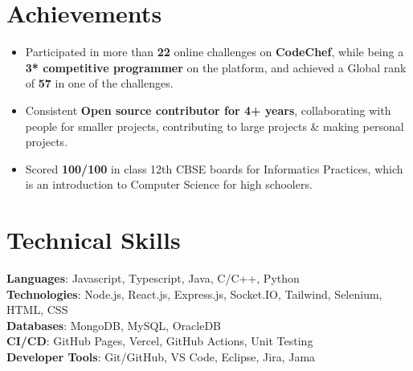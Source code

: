 \documentclass[letterpaper,11pt]{article}
\newcommand{\resumeItem}[1]{
  \item\small{
    {#1 \vspace{-2pt}}
  }
}
\newcommand{\resumeItemListStart}{\begin{itemize}}
\newcommand{\resumeItemListEnd}{\end{itemize}\vspace{-5pt}}
\begin{document}
\section{Achievements}
  \resumeItemListStart
    \resumeItem{Participated in more than \textbf{22} online challenges on \textbf{CodeChef}, while being a \textbf{3* competitive programmer} on the platform, and achieved a Global rank of \textbf{57} in one of the challenges.}
    \resumeItem{Consistent \textbf{Open source contributor for 4+ years}, collaborating with people for smaller projects, contributing to large projects \& making personal projects.}
    \resumeItem{Scored \textbf{100/100} in class 12th CBSE boards for Informatics Practices, which is an introduction to Computer Science for high schoolers.}
  \resumeItemListEnd

\section{Technical Skills}
  \begin{itemize}[leftmargin=0.15in, label={}]
    \small{\item{
      \textbf{Languages}{: Javascript, Typescript, Java, C/C++, Python} \\
      \textbf{Technologies}{: Node.js, React.js, Express.js, Socket.IO, Tailwind, Selenium, HTML, CSS} \\
      \textbf{Databases}{: MongoDB, MySQL, OracleDB} \\
      \textbf{CI/CD}{: GitHub Pages, Vercel, GitHub Actions, Unit Testing} \\
      \textbf{Developer Tools}{: Git/GitHub, VS Code, Eclipse, Jira, Jama} \\
    }}
  \end{itemize}
\end{document}
